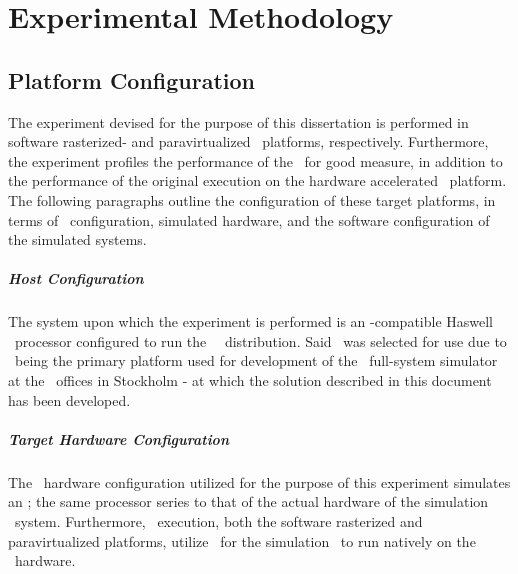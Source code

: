 
\chapter{Experimental Methodology}
\label{cha:experimentalmethodology}

\section{Platform Configuration}
\label{sec:experimentalmethodology_platformconfiguration}
The experiment devised for the purpose of this dissertation is performed in software rasterized- and paravirtualized \dvttermsimics\ platforms, respectively.
Furthermore, the experiment profiles the performance of the \dvttermreferencesolution\ for good measure, in addition to the performance of the original execution on the hardware accelerated \dvttermhost\ platform.
The following paragraphs outline the configuration of these target platforms, in terms of \dvttermhost\ configuration, simulated hardware, and the software configuration of the simulated systems.

\paragraph{Host Configuration}
\label{par:experimentalmethodology_platformconfiguration_hostconfiguration}
The system upon which the experiment is performed is an \dvttermxeightysix -compatible Haswell \dvttermintel\ processor configured to run the \dvttermfedora\ \dvttermlinux\ distribution.
Said \dvttermos\ was selected for use due to \dvttermfedora\ being the primary platform used for development of the \dvttermsimics\ full-system simulator at the \dvttermintel\ offices in Stockholm - at which the solution described in this document has been developed.


\paragraph{Target Hardware Configuration}
\label{par:experimentalmethodology_platformconfiguration:targethardwareconfiguration}
The \dvttermsimics\ hardware configuration utilized for the purpose of this experiment simulates an \dvttermintelcoreiseven ; the same processor series to that of the actual hardware of the simulation \dvttermhost\ system.
Furthermore, \dvttermsimics\ execution, both the software rasterized and paravirtualized platforms, utilize \dvttermkvm\ for the simulation \dvttermtarget\ to run natively on the \dvttermhost\ hardware.

